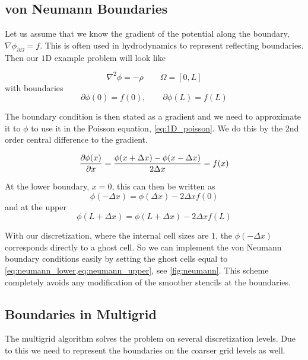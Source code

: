 \subsection{von Neumann Boundaries}
	Let us assume that we know the gradient of the potential along the boundary, \(\nabla\phi_{\partial \Omega} = f\).
	This is often used in hydrodynamics to represent reflecting boundaries.
	Then our \(1\)D example problem will look like

	\begin{equation}
		\nabla^2 \phi = -\rho \qquad \Omega = [0,L] \label{eq:1D_poisson}
	\end{equation}
	with boundaries
	\begin{equation}
		\partial \phi(0) = f(0), \qquad \partial \phi(L) = f(L)
	\end{equation}

	The boundary condition is then stated as a gradient and we need to approximate it
	to \(\phi\) to use it in the Poisson equation, \cref{eq:1D_poisson}.
	We do this by the \(2\)nd order central difference to the gradient.

	\begin{equation}
		\pdv{\phi(x)}{x} = \frac{\phi(x +\Delta x ) - \phi(x -\Delta x )}{2\Delta x} = f(x)
	\end{equation}

	At the lower boundary, \(x=0\), this can then be written as
	\begin{equation}
		\phi(-\Delta x) = \phi(\Delta x) - 2\Delta x f(0) \label{eq:neumann_lower}
	\end{equation}
	and at the upper
	\begin{equation}
		\phi(L + \Delta x) = \phi(L + \Delta x) - 2\Delta x f(L) \label{eq:neumann_upper}
	\end{equation}

	With our discretization, where the internal cell sizes are \(1\), the \(\phi(-\Delta x)\)
	corresponds directly to a ghost cell. So we can implement the von Neumann boundary conditions
	easily by setting the ghost cells equal to \cref{eq:neumann_lower,eq:neumann_upper},
	see \cref{fig:neumann}.
	This scheme completely avoids any modification of the smoother stencils at the boundaries.

	\subsection{Boundaries in Multigrid}
	The multigrid algorithm solves the problem on several discretization levels.
	Due to this we need to represent the boundaries on the coarser grid levels as well.

